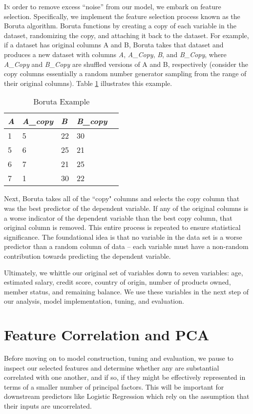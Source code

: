 \documentclass[twoside,twocolumn]{article}
\begin{document}
\lettrine[nindent=0em,lines=2]{I} n order to remove excess “noise” 
from our model, we embark on feature selection. 
Specifically, we implement the feature selection process known as the Boruta algorithm. 
Boruta functions by creating a copy of each variable in the dataset, randomizing the copy, and attaching it back to the dataset. 
For example, if a dataset has original columns A and B, Boruta takes that dataset and produces a new dataset with columns \textit{A}, \textit{A\_Copy}, \textit{B}, and \textit{B\_Copy}, where \textit{A\_Copy} and \textit{B\_Copy} are shuffled versions of A and B, respectively (consider the copy columns essentially a random number generator sampling from the range of their original columns). 
Table \ref{table:boruta} illustrates this example.
\begin{table}
  \centering
  \caption{Boruta Example}
  \begin{tabular}{lllll}
  \toprule
   \textit{A} &  \textit{A\_copy} &  \textit{B} &  \textit{B\_copy} \\
  \midrule
   1 &       5 & 22 &      30 \\
   5 &       6 & 25 &      21 \\
   6 &       7 & 21 &      25 \\
   7 &       1 & 30 &      22 \\
  \bottomrule
  \end{tabular}
  \label{table:boruta}
  \end{table}
  
Next, Boruta takes all of the ``copy" columns and selects the copy column that was the best predictor of the dependent variable. 
If any of the original columns is a worse indicator of the dependent variable than the best copy column, 
that original column is removed. This entire process is repeated to ensure statistical significance. 
The foundational idea is that no variable in the data set is a worse predictor than a random column of data – each variable must have a non-random contribution towards predicting the dependent variable.

Ultimately, we whittle our original set of variables down to seven variables: age, estimated salary,  credit score, country of origin, number of products owned, member status, and remaining balance. We use these variables in the next step of our analysis, model implementation, tuning, and evaluation.

\section{Feature Correlation and PCA}
Before moving on to model construction, tuning and evaluation, we pause to inspect our selected features and determine whether any are substantial correlated with one another, and if so, if they might be effectively represented in terms of a smaller number of principal factors. This will be important for downstream predictors like Logistic Regression which rely on the assumption that their inputs are uncorrelated. 
\end{document}
